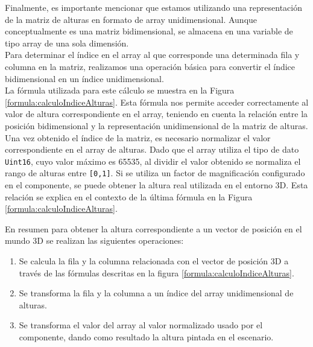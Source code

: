 \documentclass[a4paper, 11pt]{book}
\begin{document}
Finalmente, es importante mencionar que estamos utilizando una representación de la matriz de alturas en formato de array unidimensional. Aunque conceptualmente es una matriz bidimensional, se almacena en una variable de tipo array de una sola dimensión. \\
Para determinar el índice en el array al que corresponde una determinada fila y columna en la matriz, realizamos una operación básica para convertir el índice bidimensional en un índice unidimensional.\\
La fórmula utilizada para este cálculo se muestra en la Figura \ref{formula:calculoIndiceAlturas}. Esta fórmula nos permite acceder correctamente al valor de altura correspondiente en el array, teniendo en cuenta la relación entre la posición bidimensional y la representación unidimensional de la matriz de alturas.\\

Una vez obtenido el índice de la matriz, es necesario normalizar el valor correspondiente en el array de alturas. Dado que el array utiliza el tipo de dato \texttt{Uint16}, cuyo valor máximo es 65535, al dividir el valor obtenido se normaliza el rango de alturas entre \texttt{[0,1]}. Si se utiliza un factor de magnificación configurado en el componente, se puede obtener la altura real utilizada en el entorno 3D. Esta relación se explica en el contexto de la última fórmula en la Figura \ref{formula:calculoIndiceAlturas}.

En resumen para obtener la altura correspondiente a un vector de posición en el mundo 3D se realizan las siguientes operaciones:
\begin{enumerate}
	\item Se calcula la fila y la columna relacionada con el vector de posición 3D a través de las fórmulas descritas en la figura \ref{formula:calculoIndiceAlturas}.
	\item Se transforma la fila y la columna a un índice del array unidimensional de alturas.
	\item Se transforma el valor del array al valor normalizado usado por el componente, dando como resultado la altura pintada en el escenario.
\end{enumerate}
\end{document}
